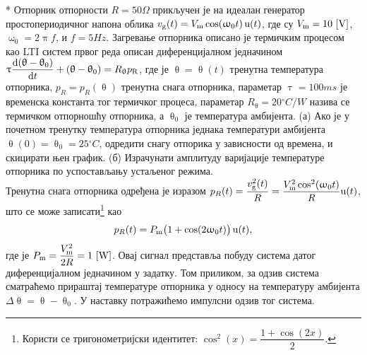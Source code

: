 {\color{red}*}\PID
Отпорник отпорности $R = 50\unit{\Omega}$ прикључен је на идеалан генератор простопериодичног напона облика 
$v_{\rm g}(t) = V_{\rm m} \cos(\upomega_0 t)\,{\rm u}(t)$, где су $V_{\rm m} = 10\,\left[\mathrm{V}\right]$, 
$\upomega_0 = 2\uppi f$, и $f = 5\unit{Hz}$. Загревање отпорника описано је термичким 
процесом као LTI систем првог реда описан диференцијалном једначином 
$\uptau \dfrac{{\rm d} (\uptheta-\uptheta_0)}{{\rm d} t} + (\uptheta-\uptheta_0) = R_{\uptheta} p_{\rm R}$, где је 
$\uptheta = \uptheta(t)$ тренутна температура отпорника, 
$p_R = p_R(\uptheta)$ тренутна снага отпорника, параметар
$\uptau = 100\unit{ms}$ је временска константа тог термичког процеса,
 параметар $R_{\uptheta} = 20\unit{^\circ C/W}$ назива се термичком отпорношћу 
отпорника, а $\uptheta_0$ је температура амбијента. 
(а) Ако је у почетном тренутку температура отпорника једнака температури амбијента $\uptheta(0) = \uptheta_0 = 25\unit{^\circ C}$,
одредити снагу отпорика у зависности од времена, и скицирати њен график. 
(б) Израчунати амплитуду варијације температуре отпорника по успостављању 
устаљеног режима. 
\\[2mm]

\textsc{}
Тренутна снага отпорника одређена је изразом 
$p_{R}(t) = \dfrac{v_{\rm g}^2(t)}{R} = \dfrac{V_{\rm m}^2 \cos^2(\upomega_0 t)}{R} {\rm u}(t)$, што се може 
записати\footnote{
    Користи се тригонометријски идентитет: $\cos^2(x) = \dfrac{1 + \cos(2x)}{2}$.
}
као 
\begin{equation}
    p_{R}(t) = P_{\rm m} \bigl(1 + \cos(2\upomega_0 t) \bigr) \, \uu(t), \label{eq:\ID.1}
\end{equation} 
где је 
$P_{\rm m} = \dfrac{V_{\rm m}^2}{2R} = 1\,\left[\mathrm{W}\right]$. Овај сигнал представља побуду система датог диференцијалном
једначином у задатку. Том приликом, за одзив система сматраћемо прираштај температуре отпорника у односу 
на температуру амбијента $\Delta\uptheta = \uptheta - \uptheta_0$. У наставку потражићемо импулсни одзив тог система. 

